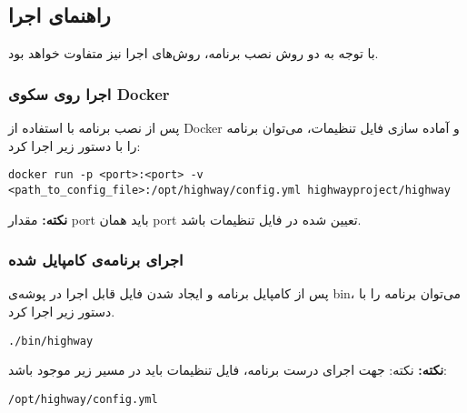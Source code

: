 \subsection*{راهنمای اجرا}
با توجه به دو روش نصب برنامه، روش‌های اجرا نیز متفاوت خواهد بود.

\subsubsection*{اجرا روی سکوی Docker}
پس از نصب برنامه با استفاده از Docker و آماده سازی فایل تنظیمات، می‌توان برنامه را با دستور زیر اجرا کرد:

\begin{latin}
  \begin{lstlisting}
docker run -p <port>:<port> -v <path_to_config_file>:/opt/highway/config.yml highwayproject/highway
  \end{lstlisting}
\end{latin}

\textbf{نکته:}
مقدار port باید همان port تعیین شده در فایل تنظیمات باشد.

\subsubsection*{اجرای برنامه‌ی کامپایل شده}
پس از کامپایل برنامه و ایجاد شدن فایل قابل اجرا در پوشه‌ی bin، می‌توان برنامه را با دستور زیر اجرا کرد.

\begin{latin}
  \begin{lstlisting}
./bin/highway
  \end{lstlisting}
\end{latin}

\textbf{نکته:}
نکته: جهت اجرای درست برنامه، فایل تنظیمات باید در مسیر زیر موجود باشد:

\begin{latin}
  \begin{lstlisting}
/opt/highway/config.yml
  \end{lstlisting}
\end{latin}